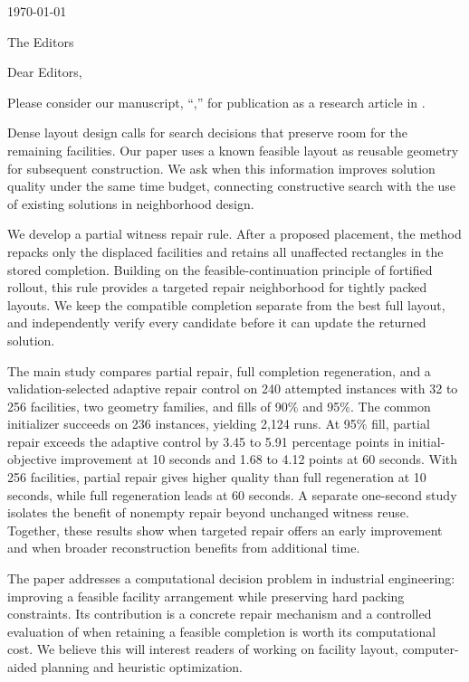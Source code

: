 \documentclass[11pt,a4paper]{article}
\begin{document}
\hfill \today

The Editors\\
\textit{\TargetJournal}

Dear Editors,

Please consider our manuscript, ``\PaperTitle,'' for publication as a research
article in \textit{\TargetJournal}.

Dense layout design calls for search decisions that preserve room for the
remaining facilities. Our paper uses a known feasible layout as reusable geometry
for subsequent construction. We ask when this information improves solution
quality under the same time budget, connecting constructive search with the use
of existing solutions in neighborhood design.

We develop a partial witness repair rule. After a proposed placement, the method
repacks only the displaced facilities and retains all unaffected rectangles in
the stored completion. Building on the feasible-continuation principle of
fortified rollout, this rule provides a targeted repair neighborhood for tightly
packed layouts. We keep the compatible completion separate from the best full
layout, and independently verify every candidate before it can update the
returned solution.

The main study compares partial repair, full completion regeneration, and a
validation-selected adaptive repair control on 240 attempted instances with
32 to 256 facilities, two geometry families, and fills of 90\% and 95\%.
The common initializer succeeds on 236 instances, yielding 2,124 runs.
At 95\% fill, partial repair exceeds the adaptive control by 3.45 to
5.91 percentage points in initial-objective improvement at 10 seconds and
1.68 to 4.12 points at 60 seconds. With 256 facilities, partial repair gives
higher quality than full regeneration at 10 seconds, while full regeneration
leads at 60 seconds. A separate one-second study isolates the benefit of
nonempty repair beyond unchanged witness reuse. Together, these results show
when targeted repair offers an early improvement and when broader
reconstruction benefits from additional time.

The paper addresses a computational decision problem in industrial engineering:
improving a feasible facility arrangement while preserving hard packing
constraints. Its contribution is a concrete repair mechanism and a controlled
evaluation of when retaining a feasible completion is worth its computational
cost. We believe this will interest readers of \textit{\TargetJournal} working
on facility layout, computer-aided planning and heuristic optimization.
\end{document}
